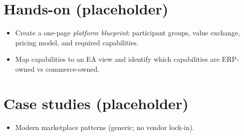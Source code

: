 \section{Hands-on (placeholder)}
\begin{itemize}
  \item Create a one-page \emph{platform blueprint}: participant groups, value exchange, pricing model, and required capabilities.
  \item Map capabilities to an EA view and identify which capabilities are ERP-owned vs commerce-owned.
\end{itemize}

\section{Case studies (placeholder)}
\begin{itemize}
  \item Modern marketplace patterns (generic; no vendor lock-in).
\end{itemize}

